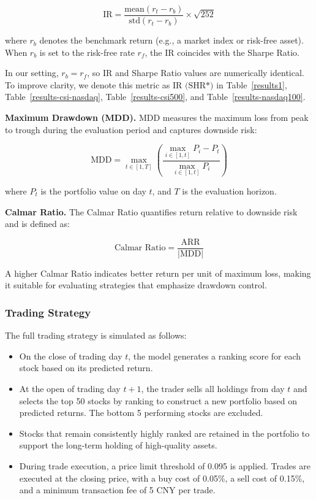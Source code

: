 \documentclass{article}
\begin{document}
\begin{equation}
\text{IR} = \frac{\text{mean}(r_t - r_b)}{\text{std}(r_t - r_b)} \times \sqrt{252}
\end{equation}

where $r_b$ denotes the benchmark return (e.g., a market index or risk-free asset).
When $r_b$ is set to the risk-free rate $r_f$, the IR coincides with the Sharpe Ratio.

In our setting, $r_b = r_f$, so IR and Sharpe Ratio values are numerically identical. 
To improve clarity, we denote this metric as $\text{IR (SHR*)}$ in Table~\ref{results1}, Table~\ref{results-csi-nasdaq}, Table~\ref{results-csi500}, and Table~\ref{results-nasdaq100}.

\textbf{Maximum Drawdown (MDD).}
MDD measures the maximum loss from peak to trough during the evaluation period and captures downside risk:

\begin{equation}
\text{MDD} = \max_{t \in [1, T]} \left( \frac{\max_{i \in [1, t]} P_i - P_t}{\max_{i \in [1, t]} P_i} \right)
\end{equation}

where $P_t$ is the portfolio value on day $t$, and $T$ is the evaluation horizon.

\textbf{Calmar Ratio.}
The Calmar Ratio quantifies return relative to downside risk and is defined as:

\begin{equation}
\text{Calmar Ratio} = \frac{\text{ARR}}{|\text{MDD}|}
\end{equation}

A higher Calmar Ratio indicates better return per unit of maximum loss, making it suitable for evaluating strategies that emphasize drawdown control.


\subsubsection{Trading Strategy} \label{app:trading}
The full trading strategy is simulated as follows:
\begin{itemize}[leftmargin=4ex]
\item On the close of trading day $t$, the model generates a ranking score for each stock based on its predicted return.
\item At the open of trading day $t+1$, the trader sells all holdings from day $t$ and selects the top 50 stocks by ranking to construct a new portfolio based on predicted returns. The bottom 5 performing stocks are excluded.
\item Stocks that remain consistently highly ranked are retained in the portfolio to support the long-term holding of high-quality assets.
\item During trade execution, a price limit threshold of 0.095 is applied. Trades are executed at the closing price, with a buy cost of 0.05\%, a sell cost of 0.15\%, and a minimum transaction fee of 5 CNY per trade.
\end{itemize}
\end{document}
